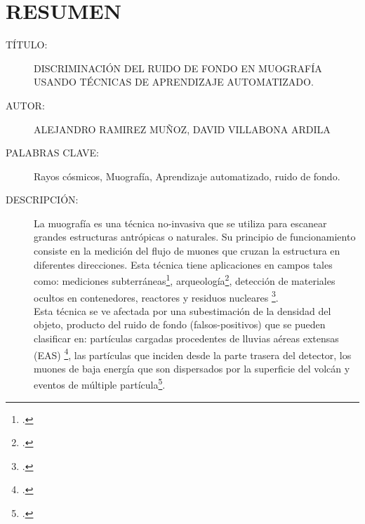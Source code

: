 \chapter*{RESUMEN}

\footnotesize{
\begin{description}
  \item[TÍTULO:] DISCRIMINACIÓN DEL RUIDO DE FONDO EN MUOGRAFÍA USANDO TÉCNICAS DE APRENDIZAJE AUTOMATIZADO. 
  \item[AUTOR:] ALEJANDRO RAMIREZ MUÑOZ, DAVID VILLABONA ARDILA 
  \item[PALABRAS CLAVE:] Rayos cósmicos, Muografía, Aprendizaje automatizado, ruido de fondo.
  \item[DESCRIPCIÓN:]\hfill 
  
  La muografía es una técnica no-invasiva que se utiliza para escanear grandes estructuras antrópicas o naturales. Su principio de funcionamiento consiste en la medición del flujo de muones que cruzan la estructura en diferentes direcciones. Esta técnica tiene aplicaciones en campos tales como: mediciones subterráneas\footcite{Tanaka2005, Tanaka2009, Lesparre2010, Lesparre2011, Lesparre2012}, arqueología\footcite{Morishima2017, Gmez2016, Alvarez1970}, detección de materiales ocultos en contenedores, reactores  y residuos nucleares \footcite{Fujii2013}.\\

Esta técnica se ve afectada por una subestimación de la densidad del objeto, producto del ruido de fondo (falsos-positivos) que se pueden clasificar en: partículas cargadas procedentes de lluvias aéreas extensas (EAS) \footcite{Nishiyama2014,Gomez2017}, las partículas que inciden desde la parte trasera del detector, los muones de baja energía que son dispersados por la superficie del volcán y eventos de múltiple partícula\footcite{nishiyama2014experimental}.\\


\end{description}}
